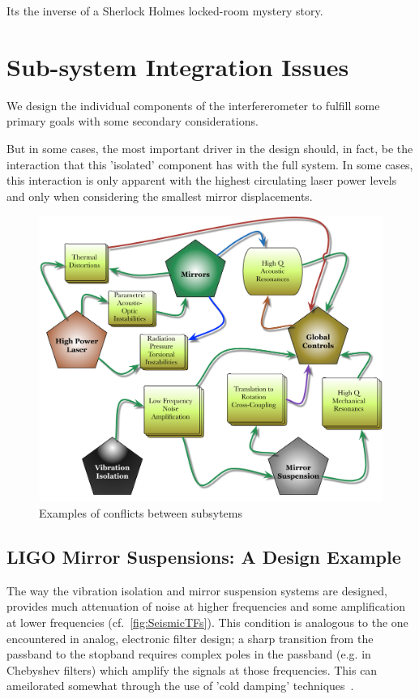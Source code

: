 Its the inverse of a Sherlock Holmes locked-room mystery story.


\section{Sub-system Integration Issues}
We design the individual components of the interfererometer to fulfill some
primary goals with some secondary considerations.

But in some cases, the most important driver in the design should, in fact, be the
interaction that this 'isolated' component has with the full system. In some cases,
this interaction is only apparent with the highest circulating laser power levels
and only when considering the smallest mirror displacements.


\begin{figure}[h]
\centering
\includegraphics[width=\columnwidth]{Figures/SystemConflicts.pdf}
\caption{Examples of conflicts between subsytems}
\label{fig:SystemConflicts}
\end{figure}

\subsection{LIGO Mirror Suspensions: A Design Example}
The way the vibration isolation and mirror suspension systems are designed,
provides much attenuation of noise at higher frequencies and some amplification
at lower frequencies (cf.~\ref{fig:SeismicTFs}). This condition is analogous to the
one encountered in analog, electronic filter design;  a sharp transition from
the passband to the stopband requires complex poles in the passband (e.g.
in Chebyshev filters) which amplify the signals at those frequencies. This
can ameilorated somewhat through the use of 'cold damping' 
techniques~\cite{Kuroda:1982vf, Forward:1979ks}.


